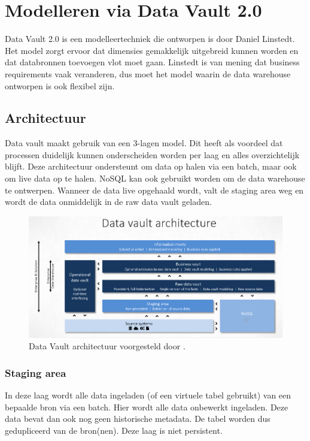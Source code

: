 \section{Modelleren via Data Vault 2.0}
Data Vault 2.0 is een modelleertechniek die ontworpen is door Daniel Linstedt. Het model zorgt ervoor dat dimensies gemakkelijk uitgebreid kunnen worden en dat databronnen toevoegen vlot moet gaan. Linstedt is van mening dat business requirements vaak veranderen, dus moet het model waarin de data warehouse ontworpen is ook flexibel zijn. 
~\autocite{Linstedt2016}
\subsection{Architectuur}
Data vault maakt gebruik van een 3-lagen model. Dit heeft als voordeel dat processen duidelijk kunnen onderscheiden worden per laag en alles overzichtelijk blijft. Deze architectuur ondersteunt om data op halen via een batch, maar ook om live data op te halen. NoSQL kan ook gebruikt worden om de data warehouse te ontwerpen. Wanneer de data live opgehaald wordt, valt de staging area weg en wordt de data onmiddelijk in de raw data vault geladen.  ~\autocite{Linstedt2016}


\begin{figure}[h]
	\includegraphics[scale=0.63]{../images/DVArchitectuur.png}
	\caption{Data Vault architectuur voorgesteld door \textcite{Stroobants2018}.}
	\label{fig:dvarch}
\end{figure}

\subsubsection{Staging area}
In deze laag wordt alle data ingeladen (of een virtuele tabel gebruikt) van een bepaalde bron via een batch. Hier wordt alle data onbewerkt ingeladen. Deze data bevat dan ook nog geen historische metadata. De tabel worden dus gedupliceerd van de bron(nen). Deze laag is niet persistent.

